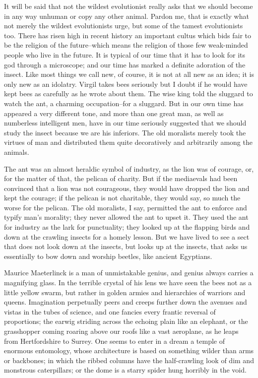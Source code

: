 \documentclass[final,10pt,letterpaper,twocolumn,openany]{book}
\begin{document}
It will be said that not the wildest evolutionist really asks that we
should become in any way unhuman or copy any other animal. Pardon me,
that is exactly what not merely the wildest evolutionists urge, but some of
the tamest evolutionists too. There has risen high in recent history an
important cultus which bids fair to be the religion of the future--which
means the religion of those few weak-minded people who live in the
future. It is typical of our time that it has to look for its god through a
microscope; and our time has marked a definite adoration of the insect.
Like most things we call new, of course, it is not at all new as an idea; it is
only new as an idolatry. Virgil takes bees seriously but I doubt if he would
have kept bees as carefully as he wrote about them. The wise king told the
sluggard to watch the ant, a charming occupation--for a sluggard. But in
our own time has appeared a very different tone, and more than one great
man, as well as numberless intelligent men, have in our time seriously
suggested that we should study the insect because we are his inferiors. The
old moralists merely took the virtues of man and distributed them quite
decoratively and arbitrarily among the animals. 

The ant was an almost
heraldic symbol of industry, as the lion was of courage, or, for the matter
of that, the pelican of charity. But if the mediaevals had been convinced
that a lion was not courageous, they would have dropped the lion and kept
the courage; if the pelican is not charitable, they would say, so much the
worse for the pelican. The old moralists, I say, permitted the ant to enforce
and typify man's morality; they never allowed the ant to upset it. They
used the ant for industry as the lark for punctuality; they looked up at the
flapping birds and down at the crawling insects for a homely lesson. But
we have lived to see a sect that does not look down at the insects, but
looks up at the insects, that asks us essentially to bow down and worship
beetles, like ancient Egyptians.

Maurice Maeterlinck is a man of unmistakable genius, and genius
always carries a magnifying glass. In the terrible crystal of his lens we
have seen the bees not as a little yellow swarm, but rather in golden armies
and hierarchies of warriors and queens. Imagination perpetually peers and
creeps further down the avenues and vistas in the tubes of science, and one
fancies every frantic reversal of proportions; the earwig striding across the
echoing plain like an elephant, or the grasshopper coming roaring above
our roofs like a vast aeroplane, as he leaps from Hertfordshire to Surrey.
One seems to enter in a dream a temple of enormous entomology, whose
architecture is based on something wilder than arms or backbones; in
which the ribbed columns have the half-crawling look of dim and
monstrous caterpillars; or the dome is a starry spider hung horribly in the
void. 
\end{document}
